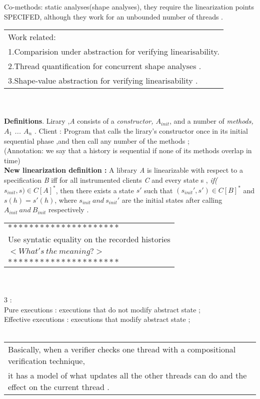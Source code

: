 \documentclass{article}
\newcommand{\B}{\bfseries}
\begin{document}
Co-methods: static analyses(shape analyses), they require the linearization points SPECIFED, although they work for an unbounded number of threads . \newline
\colorbox{green!35!blue!24}{
\begin{tabular}{|l|}\hline
Work related: \\
1.Comparision under abstraction for verifying linearisability. \\
2.Thread quantification for concurrent shape analyses .\\
3.Shape-value abstraction for verifying linearisability .\\
\hline
\end{tabular}
}\newline
\\\\

{\large{}\bfseries{Definitions}}. Lirary ,{\it{A}} consists of a {\it{constructor, $A_{init}$}}, and a number of {\it{methods},$A_{1}$ ... $A_{n}$} . Client : Program that calls the lirary's constructor once in its initial sequential phase ,and then call any number of the methods ;\\
{(\color{red}Annotation: we say that a history is sequential if none of its methods overlap in time)} \\

\noindent
{\B{}New linearization definition :}
A library {\it{A}} is linearizable with respect to a specification {\it{B}} iff for all instrumented clients {\it{C}} and every state s , {\it{if($s_{init},s)\in C[A]^*$}}, then there exists a state $s'$ such that $(s_{init}', s')\in C[B]^*$ and $s(h) = s'(h)$, where $s_{init} \ and\  s_{init}'$ are the initial states after calling $A_{init}\ and\  B_{init}$ respectively .
\\
\colorbox{red!35!green!24}{
\begin{tabular}{l}\hline
$*********************$ \\
Use syntatic equality on the recorded histories \\

$<What's\  the\  meaning ?>$ \\
$*********************$\\
\hline
\end{tabular}
}\\\\
3 : \\
Pure executions : executions that do not modify abstract state ;\\
Effective executions : executions that modify abstract state ;
\\\\
\begin{tabular}{l}\hline
Basically, when a verifier checks one thread with a compositional verification technique,
\\ it has a model of what updates all the other threads can do and the effect on the current thread .\\\hline
\end{tabular}
\\\\
\end{document}
